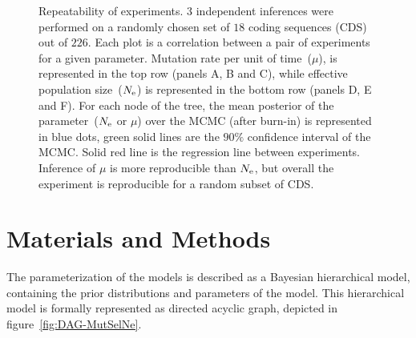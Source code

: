 \begin{figure}[htbp]
    \caption[Repeatability of experiments]{
    Repeatability of experiments.
    $3$ independent inferences were performed on a randomly chosen set of $18$ coding sequences (\acrshort{CDS}) out of $226$.
    Each plot is a correlation between a pair of experiments for a given parameter.
    Mutation rate per unit of time~($\mu$), is represented in the top row (panels A, B and C), while effective population size~($N_{\mathrm{e}}$) is represented in the bottom row (panels D, E and F).
    For each node of the tree, the mean posterior of the parameter~($N_{\mathrm{e}}$ or $\mu$) over the \acrshort{MCMC} (after burn-in) is represented in blue dots, green solid lines are the $90\%$ confidence interval of the \acrshort{MCMC}.
    Solid red line is the regression line between experiments.
    Inference of $\mu$ is more reproducible than $N_{\mathrm{e}}$, but overall the experiment is reproducible for a random subset of \acrshort{CDS}.
    }
    \label{fig:mammals_repeatability}
\end{figure}


\section{Materials and Methods}
\label{sec:MatMet}
The parameterization of the models is described as a Bayesian hierarchical model, containing the prior distributions and parameters of the model.
This hierarchical model is formally represented as directed acyclic graph, depicted in figure~\ref{fig:DAG-MutSelNe}.

